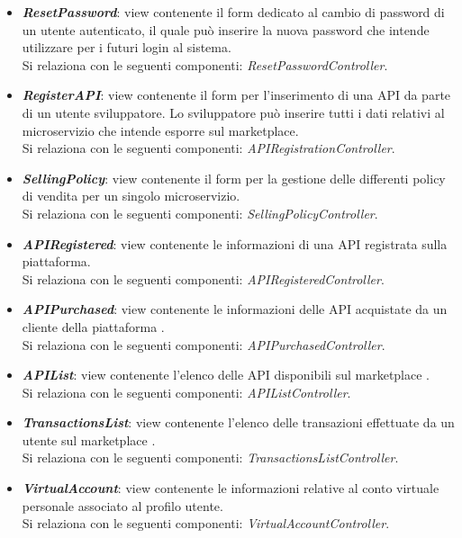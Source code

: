 \begin{itemize}
\begin{itemize}
		\item \textbf{\textit{ResetPassword}}: view contenente il form dedicato al cambio di password di un utente autenticato, il quale può inserire la nuova password che intende utilizzare per i futuri login al sistema.\\
		Si relaziona con le seguenti componenti: \textit{ResetPasswordController}.
		
		\item \textbf{\textit{RegisterAPI}}: view contenente il form per l'inserimento di una API da parte di un utente sviluppatore. Lo sviluppatore può inserire tutti i dati relativi al microservizio che intende esporre sul marketplace.\\
		Si relaziona con le seguenti componenti: \textit{APIRegistrationController}.
		
		\item \textbf{\textit{SellingPolicy}}: view contenente il form per la gestione delle differenti policy di vendita per un singolo microservizio.\\
		Si relaziona con le seguenti componenti: \textit{SellingPolicyController}.
		
		\item \textbf{\textit{APIRegistered}}: view contenente le informazioni di una API registrata sulla piattaforma.\\
		Si relaziona con le seguenti componenti: \textit{APIRegisteredController}.
		
		\item \textbf{\textit{APIPurchased}}: view contenente le informazioni delle API acquistate da un cliente della piattaforma \progetto.\\
		Si relaziona con le seguenti componenti: \textit{APIPurchasedController}.
		
		\item \textbf{\textit{APIList}}: view contenente l'elenco delle API disponibili sul marketplace \progetto.\\
		Si relaziona con le seguenti componenti: \textit{APIListController}.
		
		\item \textbf{\textit{TransactionsList}}: view contenente l'elenco delle transazioni effettuate da un utente sul marketplace \progetto.\\
		Si relaziona con le seguenti componenti: \textit{TransactionsListController}.
		
		\item \textbf{\textit{VirtualAccount}}: view contenente le informazioni relative al conto virtuale personale associato al profilo utente.\\
		Si relaziona con le seguenti componenti: \textit{VirtualAccountController}.
		

\end{itemize}
\end{itemize}
